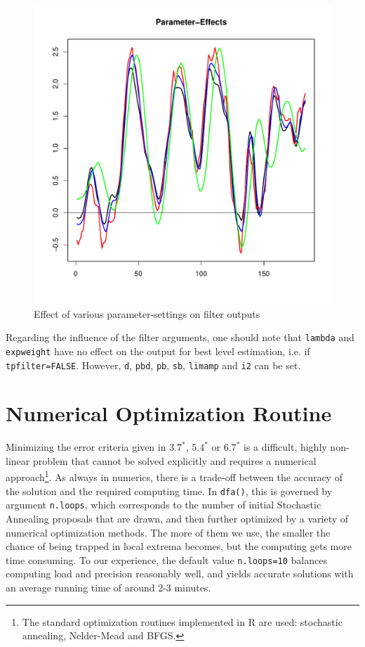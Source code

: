 \documentclass[a4paper]{article}
\begin{document}
\begin{figure}[htb!] 
\begin{center}
\includegraphics{parametersetting}
\caption{Effect of various parameter-settings on filter
  outputs\label{fig4}}
\end{center}
\end{figure}

Regarding the influence of the filter arguments, one should note that
\texttt{lambda} and \texttt{expweight} have no effect on the output
for best level estimation, i.e. if \texttt{tpfilter=FALSE}. However,
\texttt{d}, \texttt{pbd}, \texttt{pb}, \texttt{sb}, \texttt{limamp}
and \texttt{i2} can be set. 







\section{Numerical Optimization Routine}

Minimizing the error criteria given in $3.7^*$, $5.4^*$ or $6.7^*$ is
a difficult, highly non-linear problem that cannot be solved
explicitly and requires a numerical approach\footnote{The standard
  optimization routines implemented in R are used: stochastic
  annealing, Nelder-Mead and BFGS.}. As always in numerics, there is a
trade-off between the accuracy of the solution and the required
computing time.  In \texttt{dfa()}, this is governed by argument
\texttt{n.loops}, which corresponds to the number of initial
Stochastic Annealing proposals that are drawn, and then further
optimized by a variety of numerical optimization methods. The more of
them we use, the smaller the chance of being trapped in local extrema
becomes, but the computing gets more time consuming.  To our
experience, the default value \texttt{n.loops=10} balances computing
load and precision reasonably well, and yields accurate solutions with
an average running time of around 2-3 minutes. \\
\end{document}
